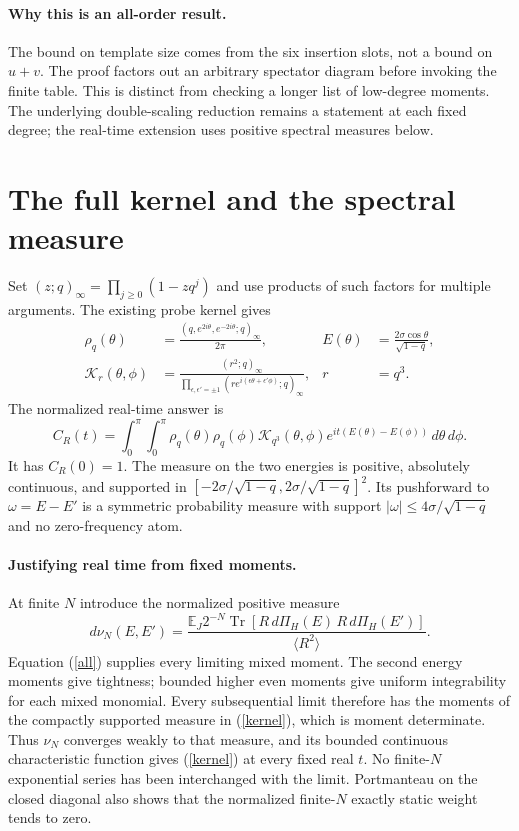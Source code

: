\documentclass[11pt,a4paper]{article}
\newcommand{\av}[1]{\langle #1\rangle}
\begin{document}
\paragraph{Why this is an all-order result.}
The bound on template size comes from the six insertion slots,
not a bound on $u+v$. The proof factors out an arbitrary spectator
diagram before invoking the finite table. This is distinct from
checking a longer list of low-degree moments. The underlying
double-scaling reduction remains a statement at each fixed degree;
the real-time extension uses positive spectral measures below.

\newpage
\section{The full kernel and the spectral measure}
Set $(z;q)_\infty=\prod_{j\ge0}(1-zq^j)$ and use products of such
factors for multiple arguments. The existing probe kernel
\cite{BNR,TT} gives
\begin{align}
 \rho_q(\theta)&=\frac{(q,e^{2i\theta},e^{-2i\theta};q)_\infty}{2\pi},
 &E(\theta)&=\frac{2\sigma\cos\theta}{\sqrt{1-q}},\\
 \mathcal K_r(\theta,\phi)&=
 \frac{(r^2;q)_\infty}
 {\prod_{\epsilon,\epsilon'=\pm1}
       (r e^{i(\epsilon\theta+\epsilon'\phi)};q)_\infty},
 &r&=q^3 .
\end{align}
The normalized real-time answer is
\begin{equation}
 C_R(t)=\int_0^\pi\!\!\int_0^\pi
 \rho_q(\theta)\rho_q(\phi)\mathcal K_{q^3}(\theta,\phi)
 e^{it(E(\theta)-E(\phi))}\,d\theta\,d\phi.             \label{kernel}
\end{equation}
It has $C_R(0)=1$. The measure on the two energies is positive,
absolutely continuous, and supported in
$[-2\sigma/\sqrt{1-q},2\sigma/\sqrt{1-q}]^2$.
Its pushforward to $\omega=E-E'$ is a symmetric probability
measure with support
$|\omega|\le4\sigma/\sqrt{1-q}$ and no zero-frequency atom.

\paragraph{Justifying real time from fixed moments.}
At finite $N$ introduce the normalized positive measure
\[
 d\nu_N(E,E')=
 \frac{\mathbb E_J2^{-N}\operatorname{Tr}
 [R\,d\Pi_H(E)\,R\,d\Pi_H(E')]}{\av{R^2}} .
\]
Equation (\ref{all}) supplies every limiting mixed moment.
The second energy moments give tightness; bounded higher even
moments give uniform integrability for each mixed monomial.
Every subsequential limit therefore has the moments of the
compactly supported measure in (\ref{kernel}), which is moment
determinate. Thus $\nu_N$ converges weakly to that measure, and
its bounded continuous characteristic function gives (\ref{kernel})
at every fixed real $t$. No finite-$N$ exponential series has been
interchanged with the limit. Portmanteau on the closed diagonal
also shows that the normalized finite-$N$ exactly static weight
tends to zero.
\end{document}

